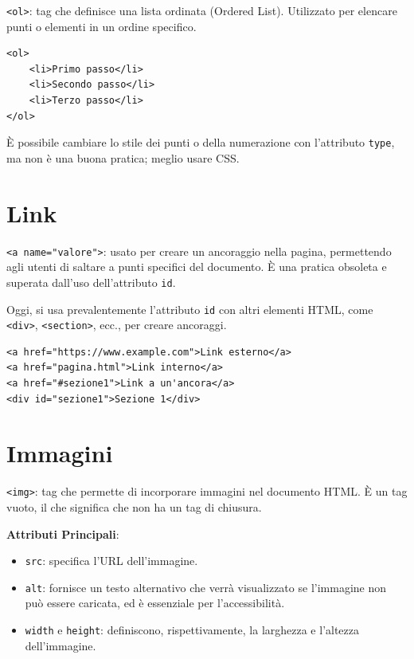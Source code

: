 \texttt{<ol>}: tag che definisce una lista ordinata (Ordered List). Utilizzato per elencare punti o elementi in un ordine specifico.

\begin{lstlisting}[language=HTML5, caption=Esempio di lista ordinata]
<ol>
    <li>Primo passo</li>
    <li>Secondo passo</li>
    <li>Terzo passo</li>
</ol>
\end{lstlisting}

È possibile cambiare lo stile dei punti o della numerazione con l'attributo \texttt{type}, ma non è una buona pratica; meglio usare CSS.

\section{Link}

\texttt{<a name="valore">}: usato per creare un ancoraggio nella pagina, permettendo agli utenti di saltare a punti specifici del documento. È una pratica obsoleta e superata dall'uso dell'attributo \texttt{id}.

Oggi, si usa prevalentemente l'attributo \texttt{id} con altri elementi HTML, come \texttt{<div>}, \texttt{<section>}, ecc., per creare ancoraggi.

\begin{lstlisting}[language=HTML5, caption=Esempi di link]
<a href="https://www.example.com">Link esterno</a>
<a href="pagina.html">Link interno</a>
<a href="#sezione1">Link a un'ancora</a>
<div id="sezione1">Sezione 1</div>
\end{lstlisting}

\section{Immagini}

\texttt{<img>}: tag che permette di incorporare immagini nel documento HTML. È un tag vuoto, il che significa che non ha un tag di chiusura.

\textbf{Attributi Principali}:
\begin{itemize}
    \item \texttt{src}: specifica l'URL dell'immagine.
    \item \texttt{alt}: fornisce un testo alternativo che verrà visualizzato se l'immagine non può essere caricata, ed è essenziale per l'accessibilità.
    \item \texttt{width} e \texttt{height}: definiscono, rispettivamente, la larghezza e l'altezza dell'immagine.
\end{itemize}

